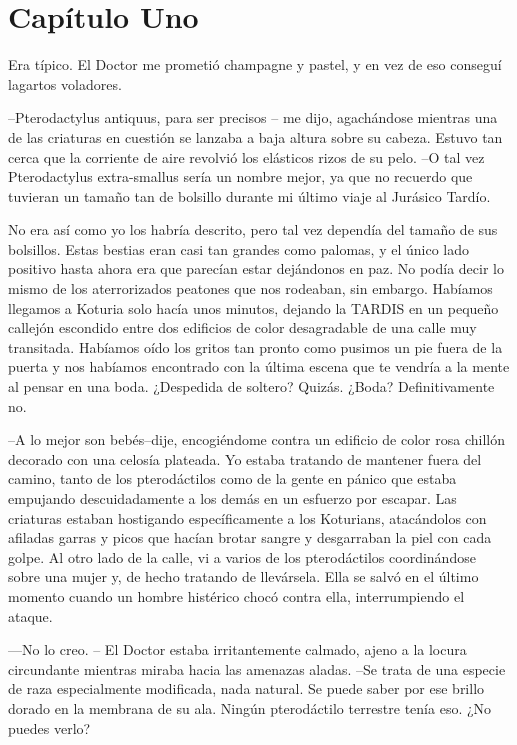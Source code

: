 \chapter*{Capítulo Uno}

Era típico. El Doctor me prometió champagne y pastel, y en vez de eso
conseguí lagartos voladores.

--Pterodactylus antiquus, para ser precisos -- me dijo, agachándose
mientras una de las criaturas en cuestión se lanzaba a baja altura sobre
su cabeza. Estuvo tan cerca que la corriente de aire revolvió los
elásticos rizos de su pelo. --O tal vez Pterodactylus extra-smallus
sería un nombre mejor, ya que no recuerdo que tuvieran un tamaño tan de
bolsillo durante mi último viaje al Jurásico Tardío.

No era así como yo los habría descrito, pero tal vez dependía del tamaño
de sus bolsillos. Estas bestias eran casi tan grandes como palomas, y el
único lado positivo hasta ahora era que parecían estar dejándonos en
paz. No podía decir lo mismo de los aterrorizados peatones que nos
rodeaban, sin embargo. Habíamos llegamos a Koturia solo hacía unos
minutos, dejando la TARDIS en un pequeño callejón escondido entre dos
edificios de color desagradable de una calle muy transitada. Habíamos
oído los gritos tan pronto como pusimos un pie fuera de la puerta y nos
habíamos encontrado con la última escena que te vendría a la mente al
pensar en una boda. ¿Despedida de soltero? Quizás. ¿Boda?
Definitivamente no.

--A lo mejor son bebés--dije, encogiéndome contra un edificio de color
rosa chillón decorado con una celosía plateada. Yo estaba tratando de
mantener fuera del camino, tanto de los pterodáctilos como de la gente
en pánico que estaba empujando descuidadamente a los demás en un
esfuerzo por escapar. Las criaturas estaban hostigando específicamente a
los Koturians, atacándolos con afiladas garras y picos que hacían brotar
sangre y desgarraban la piel con cada golpe. Al otro lado de la calle,
vi a varios de los pterodáctilos coordinándose sobre una mujer y, de
hecho tratando de llevársela. Ella se salvó en el último momento cuando
un hombre histérico chocó contra ella, interrumpiendo el ataque.

---No lo creo. -- El Doctor estaba irritantemente calmado, ajeno a la
locura circundante mientras miraba hacia las amenazas aladas. --Se trata
de una especie de raza especialmente modificada, nada natural. Se puede
saber por ese brillo dorado en la membrana de su ala. Ningún
pterodáctilo terrestre tenía eso. ¿No puedes verlo?


